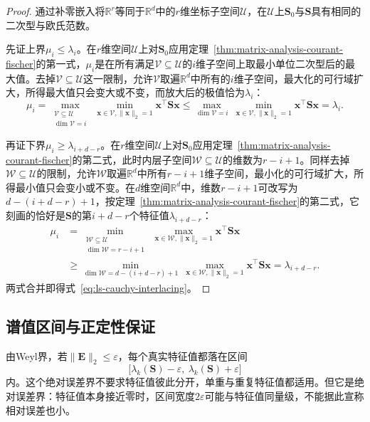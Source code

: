 \begin{proof}
通过补零嵌入将$\mathbb R^r$等同于$\mathbb R^d$中的$r$维坐标子空间$\mathcal U$，在$\mathcal U$上$\bm S_0$与$\bm S$具有相同的二次型与欧氏范数。

先证上界$\mu_i\leq\lambda_i$。在$r$维空间$\mathcal U$上对$\bm S_0$应用定理~\ref{thm:matrix-analysis-courant-fischer}的第一式，$\mu_i$是在所有满足$\mathcal V\subseteq\mathcal U$的$i$维子空间上取最小单位二次型后的最大值。去掉$\mathcal V\subseteq\mathcal U$这一限制，允许$\mathcal V$取遍$\mathbb R^d$中所有的$i$维子空间，最大化的可行域扩大，所得最大值只会变大或不变，而放大后的极值恰为$\lambda_i$：
\[
 \mu_i
 =\max_{\substack{\mathcal V\subseteq\mathcal U\\\dim\mathcal V=i}}\ \min_{\bm x\in\mathcal V,\lVert\bm x\rVert_2=1}\bm x^\top\bm S\bm x
 \leq\max_{\dim\mathcal V=i}\ \min_{\bm x\in\mathcal V,\lVert\bm x\rVert_2=1}\bm x^\top\bm S\bm x
 =\lambda_i .
\]

再证下界$\mu_i\geq\lambda_{i+d-r}$。在$r$维空间$\mathcal U$上对$\bm S_0$应用定理~\ref{thm:matrix-analysis-courant-fischer}的第二式，此时内层子空间$\mathcal W\subseteq\mathcal U$的维数为$r-i+1$。同样去掉$\mathcal W\subseteq\mathcal U$的限制，允许$\mathcal W$取遍$\mathbb R^d$中所有$r-i+1$维子空间，最小化的可行域扩大，所得最小值只会变小或不变。在$d$维空间$\mathbb R^d$中，维数$r-i+1$可改写为$d-(i+d-r)+1$，按定理~\ref{thm:matrix-analysis-courant-fischer}的第二式，它刻画的恰好是$\bm S$的第$i+d-r$个特征值$\lambda_{i+d-r}$：
\[
\begin{aligned}
 \mu_i
 &=\min_{\substack{\mathcal W\subseteq\mathcal U\\\dim\mathcal W=r-i+1}}\ \max_{\bm x\in\mathcal W,\lVert\bm x\rVert_2=1}\bm x^\top\bm S\bm x\\
 &\geq\min_{\dim\mathcal W=d-(i+d-r)+1}\ \max_{\bm x\in\mathcal W,\lVert\bm x\rVert_2=1}\bm x^\top\bm S\bm x
 =\lambda_{i+d-r} .
\end{aligned}
\]
两式合并即得式~\eqref{eq:ls-cauchy-interlacing}。
\end{proof}

\subsection{谱值区间与正定性保证}

由Weyl界，若$\lVert\bm E\rVert_2\leq\varepsilon$，每个真实特征值都落在区间
\[
 \bigl[\lambda_k(\bm S)-\varepsilon,\ \lambda_k(\bm S)+\varepsilon\bigr]
\]
内。这个绝对误差界不要求特征值彼此分开，单重与重复特征值都适用。但它是绝对误差界：特征值本身接近零时，区间宽度$2\varepsilon$可能与特征值同量级，不能据此宣称相对误差也小。

